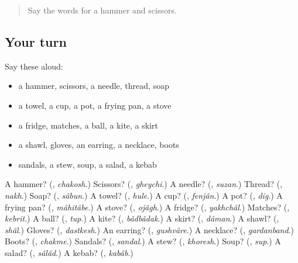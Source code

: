 \label{lesson:FA-R98-second-pass-things-in-the-house-and-clothes}



\begin{quote}
Say the words for a hammer and scissors.
\end{quote}

\subsection*{Your turn}
Say these aloud:

\begin{itemize}
\raggedright
  \item a hammer, scissors, a needle, thread, soap
  \item a towel, a cup, a pot, a frying pan, a stove
  \item a fridge, matches, a ball, a kite, a skirt
  \item a shawl, gloves, an earring, a necklace, boots
  \item sandals, a stew, soup, a salad, a kebab
\end{itemize}

\begin{tcolorbox}[breakable,colback=teal!4,colframe=teal!35!black,title={Before you move on}]
A hammer? (\textbf{}, \emph{chakosh}.) Scissors? (\textbf{}, \emph{gheychi}.) A needle? (\textbf{}, \emph{suzan}.) Thread? (\textbf{}, \emph{nakh}.) Soap? (\textbf{}, \emph{sâbun}.) A towel? (\textbf{}, \emph{hule}.) A cup? (\textbf{}, \emph{fenjân}.) A pot? (\textbf{}, \emph{dig}.) A frying pan? (\textbf{}, \emph{mâhitâbe}.) A stove? (\textbf{}, \emph{ojâgh}.) A fridge? (\textbf{}, \emph{yakhchâl}.) Matches? (\textbf{}, \emph{kebrit}.) A ball? (\textbf{}, \emph{tup}.) A kite? (\textbf{}, \emph{bâdbâdak}.) A skirt? (\textbf{}, \emph{dâman}.) A shawl? (\textbf{}, \emph{shâl}.) Gloves? (\textbf{}, \emph{dastkesh}.) An earring? (\textbf{}, \emph{gushvâre}.) A necklace? (\textbf{}, \emph{gardanband}.) Boots? (\textbf{}, \emph{chakme}.) Sandals? (\textbf{}, \emph{sandal}.) A stew? (\textbf{}, \emph{khoresh}.) Soup? (\textbf{}, \emph{sup}.) A salad? (\textbf{}, \emph{sâlâd}.) A kebab? (\textbf{}, \emph{kabâb}.)
\end{tcolorbox}
